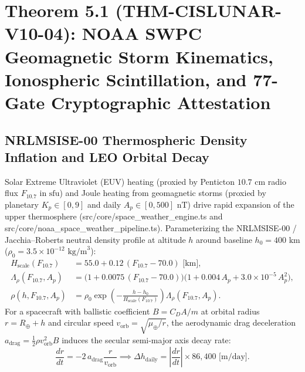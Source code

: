 \documentclass[11pt,a4paper,reqno]{article}
\def\texttt#1{#1}%
\theoremstyle{plain}
\theoremstyle{definition}
\theoremstyle{remark}
\numberwithin{equation}{section}
\begin{document}
\section{\texorpdfstring{Theorem 5.1 (\texttt{THM-CISLUNAR-V10-04}): NOAA SWPC Geomagnetic Storm Kinematics, Ionospheric Scintillation, and 77-Gate Cryptographic Attestation}{Theorem 5.1 (THM-CISLUNAR-V10-04): NOAA SWPC Geomagnetic Storm Kinematics, Ionospheric Scintillation, and 77-Gate Cryptographic Attestation}}

\subsection{NRLMSISE-00 Thermospheric Density Inflation and LEO Orbital Decay}
Solar Extreme Ultraviolet (EUV) heating (proxied by Penticton $10.7\text{ cm}$ radio flux $F_{10.7}$ in $\text{sfu}$) and Joule heating from geomagnetic storms (proxied by planetary $K_p \in [0, 9]$ and daily $A_p \in [0, 500]\text{ nT}$) drive rapid expansion of the upper thermosphere (\texttt{src/core/space\_weather\_engine.ts} and \texttt{src/core/noaa\_space\_weather\_pipeline.ts}). Parameterizing the NRLMSISE-00 / Jacchia--Roberts neutral density profile at altitude $h$ around baseline $h_0 = 400\text{ km}$ ($\rho_0 = 3.5 \times 10^{-12}\text{ kg/m}^3$):
\begin{align}
  H_{\text{scale}}(F_{10.7}) &= 55.0 + 0.12\,(F_{10.7} - 70.0)\text{ [km]}, \label{eq:scale_height} \\
  \Lambda_{\rho}(F_{10.7}, A_p) &= \big(1 + 0.0075\,(F_{10.7} - 70.0)\big)\big(1 + 0.004\,A_p + 3.0 \times 10^{-5}\,A_p^2\big), \label{eq:density_inflation} \\
  \rho(h, F_{10.7}, A_p) &= \rho_0 \exp\!\left(-\frac{h - h_0}{H_{\text{scale}}(F_{10.7})}\right) \Lambda_{\rho}(F_{10.7}, A_p). \label{eq:nrlmsise_rho}
\end{align}
For a spacecraft with ballistic coefficient $B = C_D A / m$ at orbital radius $r = R_\oplus + h$ and circular speed $v_{\text{orb}} = \sqrt{\mu_\oplus / r}$, the aerodynamic drag deceleration $a_{\text{drag}} = \frac{1}{2}\rho v_{\text{orb}}^2 B$ induces the secular semi-major axis decay rate:
\begin{equation}
  \frac{dr}{dt} = -2\,a_{\text{drag}}\frac{r}{v_{\text{orb}}} \implies \Delta h_{\text{daily}} = \left|\frac{dr}{dt}\right| \times 86,400\text{ [m/day]}.
  \label{eq:daily_decay}
\end{equation}
\end{document}
